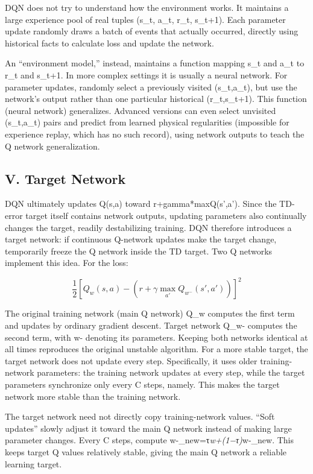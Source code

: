 DQN does not try to understand how the environment works. It maintains a large experience pool of real tuples (s\_t, a\_t, r\_t, s\_t+1). Each parameter update randomly draws a batch of events that actually occurred, directly using historical facts to calculate loss and update the network.

An ``environment model,'' instead, maintains a function mapping s\_t and a\_t to r\_t and s\_t+1. In more complex settings it is usually a neural network. For parameter updates, randomly select a previously visited (s\_t,a\_t), but use the network's output rather than one particular historical (r\_t,s\_t+1). This function (neural network) generalizes. Advanced versions can even select unvisited (s\_t,a\_t) pairs and predict from learned physical regularities (impossible for experience replay, which has no such record), using network outputs to teach the Q network generalization.

\hypertarget{v.-target-network}{%
\subsection{V. Target Network}\label{v.-target-network}}

DQN ultimately updates Q(s,a) toward r+gamma*maxQ(s',a'). Since the TD-error target itself contains network outputs, updating parameters also continually changes the target, readily destabilizing training. DQN therefore introduces a target network: if continuous Q-network updates make the target change, temporarily freeze the Q network inside the TD target. Two Q networks implement this idea. For the loss:

\[
\frac{1}{2}\left[Q_w(s,a)-\left(r+\gamma\max_{a'}Q_{w^-}(s',a')\right)\right]^2
\]

The original training network (main Q network) Q\_w computes the first term and updates by ordinary gradient descent. Target network Q\_w- computes the second term, with w- denoting its parameters. Keeping both networks identical at all times reproduces the original unstable algorithm. For a more stable target, the target network does not update every step. Specifically, it uses older training-network parameters: the training network updates at every step, while the target parameters synchronize only every C steps, namely. This makes the target network more stable than the training network.

The target network need not directly copy training-network values. ``Soft updates'' slowly adjust it toward the main Q network instead of making large parameter changes. Every C steps, compute w-\_new=τ\emph{w+(1−τ)}w-\_new. This keeps target Q values relatively stable, giving the main Q network a reliable learning target.

